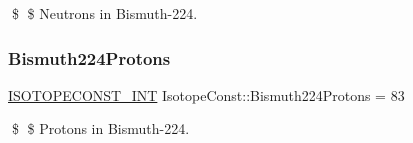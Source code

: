 \$ \$ Neutrons in Bismuth-\/224. \mbox{\label{group___isotope_const-_bismuth-_bi224_ga5857c234b688566f7fd46b64722d6e75}} 
\subsubsection{\texorpdfstring{Bismuth224\+Protons}{Bismuth224Protons}}
{\footnotesize\ttfamily \mbox{\hyperlink{group___isotope_const-_macros_ga5f18360b3e99483a35c32d789e62621c}{I\+S\+O\+T\+O\+P\+E\+C\+O\+N\+S\+T\+\_\+\+I\+NT}} Isotope\+Const\+::\+Bismuth224\+Protons = 83}

\$ \$ Protons in Bismuth-\/224. 